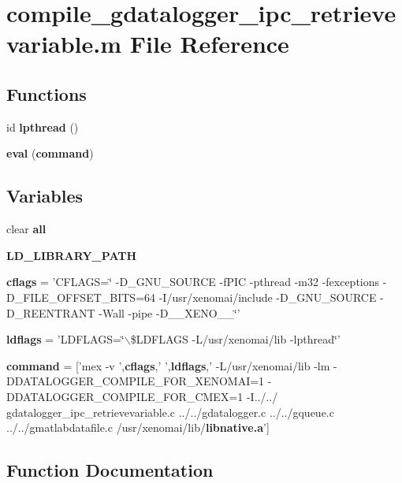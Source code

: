 \section{compile\_\-gdatalogger\_\-ipc\_\-retrievevariable.m File Reference}
\label{libs_2gdatalogger_2demo-xenomai_2matlab_2compile__gdatalogger__ipc__retrievevariable_8m}
\subsection*{Functions}
\begin{DoxyCompactItemize}
\item 
id {\bf lpthread} ()
\item 
{\bf eval} ({\bf command})
\end{DoxyCompactItemize}
\subsection*{Variables}
\begin{DoxyCompactItemize}
\item 
clear {\bf all}
\item 
{\bf LD\_\-LIBRARY\_\-PATH}
\item 
{\bf cflags} = 'CFLAGS=\char`\"{} -\/D\_\-GNU\_\-SOURCE -\/fPIC -\/pthread -\/m32 -\/fexceptions -\/D\_\-FILE\_\-OFFSET\_\-BITS=64 -\/I/usr/xenomai/include -\/D\_\-GNU\_\-SOURCE -\/D\_\-REENTRANT -\/Wall -\/pipe -\/D\_\-\_\-XENO\_\-\_\-\char`\"{}'
\item 
{\bf ldflags} = 'LDFLAGS=\char`\"{}$\backslash$\$LDFLAGS -\/L/usr/xenomai/lib -\/lpthread\char`\"{}'
\item 
{\bf command} = ['mex -\/v ',{\bf cflags},' ',{\bf ldflags},' -\/L/usr/xenomai/lib -\/lm -\/DDATALOGGER\_\-COMPILE\_\-FOR\_\-XENOMAI=1 -\/DDATALOGGER\_\-COMPILE\_\-FOR\_\-CMEX=1 -\/I../../ gdatalogger\_\-ipc\_\-retrievevariable.c ../../gdatalogger.c ../../gqueue.c ../../gmatlabdatafile.c /usr/xenomai/lib/{\bf libnative.a}']
\end{DoxyCompactItemize}


\subsection{Function Documentation}
